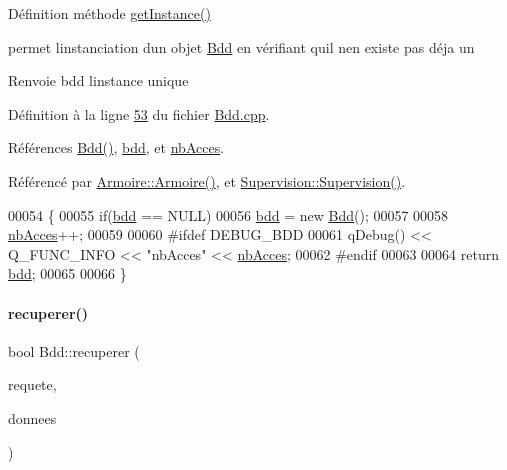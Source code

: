 Définition méthode \hyperlink{class_bdd_a6f55c29d593da12ca31fad02f5adfe24}{get\+Instance()} 

permet l\textquotesingle{}instanciation d\textquotesingle{}un objet \hyperlink{class_bdd}{Bdd} en vérifiant qu\textquotesingle{}il n\textquotesingle{}en existe pas déja un \begin{DoxyReturn}{Renvoie}
bdd l\textquotesingle{}instance unique 
\end{DoxyReturn}


Définition à la ligne \hyperlink{_bdd_8cpp_source_l00053}{53} du fichier \hyperlink{_bdd_8cpp_source}{Bdd.\+cpp}.



Références \hyperlink{_bdd_8cpp_source_l00027}{Bdd()}, \hyperlink{_bdd_8h_source_l00064}{bdd}, et \hyperlink{_bdd_8h_source_l00065}{nb\+Acces}.



Référencé par \hyperlink{_armoire_8cpp_source_l00022}{Armoire\+::\+Armoire()}, et \hyperlink{_supervision_8cpp_source_l00036}{Supervision\+::\+Supervision()}.


\begin{DoxyCode}
00054 \{
00055     \textcolor{keywordflow}{if}(\hyperlink{class_bdd_a09bd3b3a31feedf3dd42a507e0249213}{bdd} == NULL)
00056         \hyperlink{class_bdd_a09bd3b3a31feedf3dd42a507e0249213}{bdd} = \textcolor{keyword}{new} \hyperlink{class_bdd_a5306aeacb2baa3be8d4d3f8326527f60}{Bdd}();
00057 
00058     \hyperlink{class_bdd_a9fb6aa118a28c27307f27fd7662e462d}{nbAcces}++;
00059 
00060 \textcolor{preprocessor}{    #ifdef DEBUG\_BDD}
00061     qDebug() << Q\_FUNC\_INFO << \textcolor{stringliteral}{"nbAcces"} << \hyperlink{class_bdd_a9fb6aa118a28c27307f27fd7662e462d}{nbAcces};
00062 \textcolor{preprocessor}{    #endif}
00063 
00064     \textcolor{keywordflow}{return} \hyperlink{class_bdd_a09bd3b3a31feedf3dd42a507e0249213}{bdd};
00065 
00066 \}
\end{DoxyCode}
\mbox{\label{class_bdd_a8f25d29d309041bbf875700db0efd97b}} 
\paragraph{\texorpdfstring{recuperer()}{recuperer()}\hspace{0.1cm}{\footnotesize\ttfamily [1/4]}}
{\footnotesize\ttfamily bool Bdd\+::recuperer (\begin{DoxyParamCaption}\item[{Q\+String}]{requete,  }\item[{Q\+String \&}]{donnees }\end{DoxyParamCaption})}



